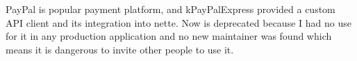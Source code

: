  \label{sec:state:paypal-express}

PayPal is popular payment platform, and \gls{kPayPalExpress} provided a custom API client and its integration into \gls{nette}. Now is deprecated because I had no use for it in any production application and no new maintainer was found which means it is dangerous to invite other people to use it.


